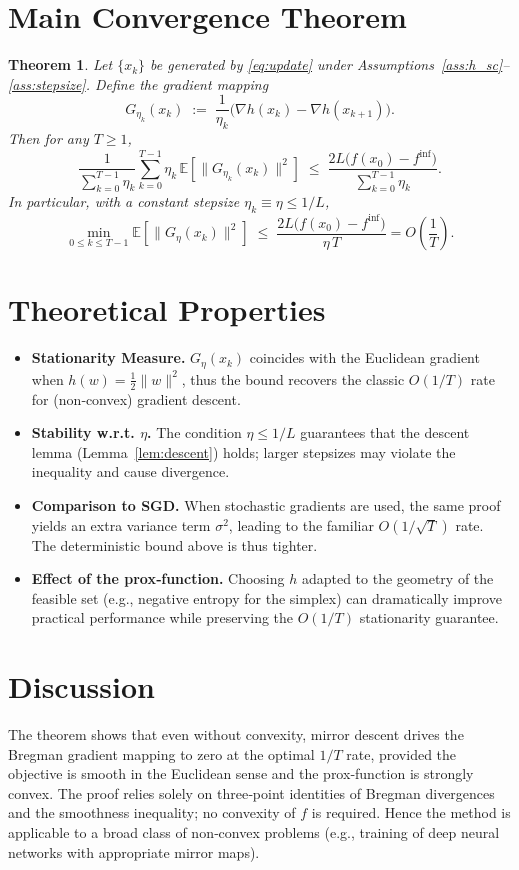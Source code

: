 \documentclass{article}
\newtheorem{theorem}{Theorem}
\newcommand{\EE}{\mathbb{E}}
\newcommand{\grad}{\nabla}
\begin{document}
\section*{Main Convergence Theorem}
\begin{theorem}\label{thm:main}
Let $\{x_{k}\}$ be generated by \eqref{eq:update} under Assumptions~\ref{ass:h_sc}--\ref{ass:stepsize}. Define the gradient mapping
\[
G_{\eta_{k}}(x_{k})\;:=\;\frac{1}{\eta_{k}}\bigl(\grad h(x_{k})-\grad h(x_{k+1})\bigr).
\]
Then for any $T\ge1$,
\[
\frac{1}{\sum_{k=0}^{T-1}\eta_{k}}\sum_{k=0}^{T-1}\eta_{k}\,\EE\!\left[\|G_{\eta_{k}}(x_{k})\|^{2}\right]
\;\le\;
\frac{2L\bigl(f(x_{0})-f^{\inf}\bigr)}{\sum_{k=0}^{T-1}\eta_{k}}.
\]
In particular, with a constant stepsize $\eta_{k}\equiv\eta\le1/L$,
\[
\min_{0\le k\le T-1}\EE\!\left[\|G_{\eta}(x_{k})\|^{2}\right]
\;\le\;
\frac{2L\bigl(f(x_{0})-f^{\inf}\bigr)}{\eta\,T}=O\!\left(\frac{1}{T}\right).
\]
\end{theorem}

\section*{Theoretical Properties}
\begin{itemize}
\item \textbf{Stationarity Measure.} $G_{\eta}(x_{k})$ coincides with the Euclidean gradient when $h(w)=\tfrac12\|w\|^{2}$, thus the bound recovers the classic $O(1/T)$ rate for (non‑convex) gradient descent.
\item \textbf{Stability w.r.t. $\eta$.} The condition $\eta\le1/L$ guarantees that the descent lemma (Lemma~\ref{lem:descent}) holds; larger stepsizes may violate the inequality and cause divergence.
\item \textbf{Comparison to SGD.} When stochastic gradients are used, the same proof yields an extra variance term $\sigma^{2}$, leading to the familiar $O(1/\sqrt{T})$ rate. The deterministic bound above is thus tighter.
\item \textbf{Effect of the prox‑function.} Choosing $h$ adapted to the geometry of the feasible set (e.g., negative entropy for the simplex) can dramatically improve practical performance while preserving the $O(1/T)$ stationarity guarantee.
\end{itemize}

\section*{Discussion}
The theorem shows that even without convexity, mirror descent drives the Bregman gradient mapping to zero at the optimal $1/T$ rate, provided the objective is smooth in the Euclidean sense and the prox‑function is strongly convex. The proof relies solely on three‑point identities of Bregman divergences and the smoothness inequality; no convexity of $f$ is required. Hence the method is applicable to a broad class of non‑convex problems (e.g., training of deep neural networks with appropriate mirror maps).
\end{document}
